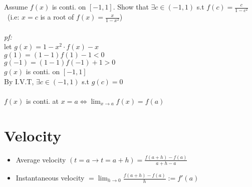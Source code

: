 \begin{eg}
Assume $f(x)$ is conti. on $[-1, 1]$. Show that $\exists c \in (-1, 1)$ s.t $f(c) = \displaystyle \frac{c}{1 - c^2}$ \ (i.e: $x = c$ is a root of $f(x) = \displaystyle \frac{x}{1 - x^2}$)\\\\
\textit{pf:}\\
let $g(x) = 1 - x^2 \cdot f(x) - x$\\
$g(1) = (1 -1)f(1) -1 < 0$\\
$g(-1) = (1 -1) f(-1) +1 > 0$\\
$g(x)$ is conti. on $[-1, 1]$\\
By I.V.T, $\exists c \in (-1, 1)$ s.t $g(c) = 0$\\\\
$f(x)$ is conti. at $x =a \Leftrightarrow \displaystyle \lim_{x \to a} f(x) = f(a)$
\end{eg}
\section{Velocity}
\begin{defn}
\begin{itemize}
\item Average velocity $(t = a \to t = a + h) \displaystyle = \frac{f(a + h) - f(a)}{a + h -a}$\\
\item Instantaneous velocity $\displaystyle = \lim_{h \to 0} \frac{f(a + h) - f(a)}{h} := f'(a)$
\end{itemize}
\end{defn}